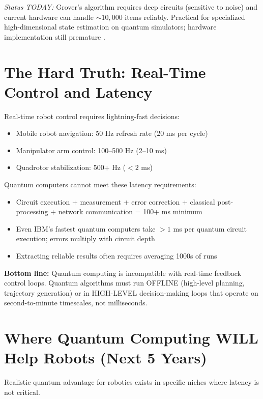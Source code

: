 \documentclass[conference]{IEEEtran}
\begin{document}
\textit{Status TODAY:} Grover's algorithm requires deep circuits (sensitive to noise) and current hardware can handle $\sim10,000$ items reliably. Practical for specialized high-dimensional state estimation on quantum simulators; hardware implementation still premature \cite{b30, b31, b32, b33}.

\section{The Hard Truth: Real-Time Control and Latency}

Real-time robot control requires lightning-fast decisions:

\begin{itemize}
\item Mobile robot navigation: 50 Hz refresh rate (20 ms per cycle) \cite{b34, b35, b36}
\item Manipulator arm control: 100--500 Hz (2--10 ms)
\item Quadrotor stabilization: 500+ Hz ($<2$ ms)
\end{itemize}

Quantum computers cannot meet these latency requirements:

\begin{itemize}
\item Circuit execution + measurement + error correction + classical post-processing + network communication = 100+ ms minimum \cite{b9, b10}
\item Even IBM's fastest quantum computers take $>1$ ms per quantum circuit execution; errors multiply with circuit depth \cite{b13, b14}
\item Extracting reliable results often requires averaging 1000s of runs
\end{itemize}

\textbf{Bottom line:} Quantum computing is incompatible with real-time feedback control loops. Quantum algorithms must run OFFLINE (high-level planning, trajectory generation) or in HIGH-LEVEL decision-making loops that operate on second-to-minute timescales, not milliseconds.

\section{Where Quantum Computing WILL Help Robots (Next 5 Years)}

Realistic quantum advantage for robotics exists in specific niches where latency is not critical.
\end{document}
